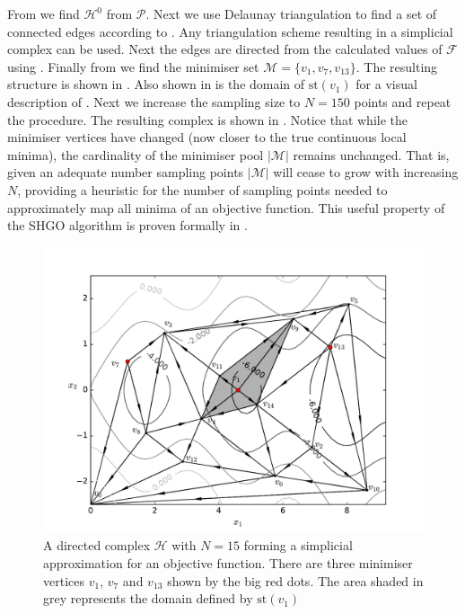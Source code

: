 From  we find $\mathcal{H}^0$ from $\mathcal{P}$. Next we use Delaunay triangulation to find a set of connected edges according to . Any triangulation scheme resulting in a simplicial complex can be used. Next the edges are directed from the calculated values of $\mathcal{F}$ using . Finally from  we find the minimiser set $\mathcal{M} = \{v_{1}, v_{7}, v_{13}\}$. The resulting structure is shown in . Also shown in  is the domain of $\textrm{st}\left( v_1 \right)$ for a visual description of . Next we increase the sampling size to $N = 150$ points and repeat the procedure. The resulting complex is shown in . Notice that while the minimiser vertices have changed (now closer to the true continuous local minima), the cardinality of the minimiser pool $|\mathcal{M}|$ remains unchanged. That is, given an adequate number sampling points $|\mathcal{M}|$ will cease to grow with increasing $N$, providing a heuristic for the number of sampling points needed to approximately map all minima of an objective function. This useful property of the SHGO algorithm is proven formally in . 

\begin{figure} 
\centerline{\includegraphics[scale=1.0]{./Fig7.pdf}}
{\caption{A directed complex $\mathcal{H}$ with $N=15$ forming a simplicial approximation for an objective function. There are three minimiser vertices $v_1$, $v_7$ and $v_{13}$ shown by the big red dots. The area shaded in grey represents the domain defined by $\textrm{st}\left( v_1 \right)$} \label{fig:alp5}}
\end{figure}

